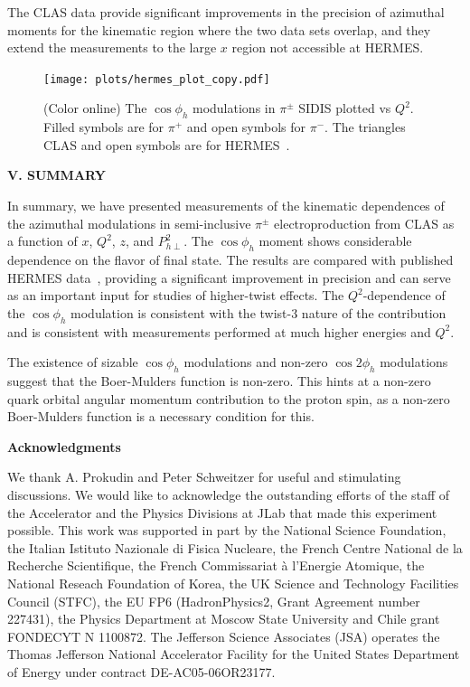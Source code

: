 \documentclass[aps,prl,twocolumn,showpacs,superscriptaddress,groupedaddress]{revtex4-1}  %
\newcommand{\Phperp}{P_{h\perp}}
\newcommand{\xbj}{x}
\begin{document}
The CLAS data provide significant improvements in the precision of azimuthal moments for the kinematic region where the two data sets overlap, and they extend the measurements to the large $\xbj$ region not accessible at HERMES.
\begin{figure}[h]
\begin{center}
\texttt{[image: plots/hermes\_plot\_copy.pdf]}
\end{center}
\caption{(Color online) The $\cos\phi_h$ modulations in $\pi^\pm$ SIDIS plotted vs $Q^2$. Filled symbols are for $\pi^+$ and open symbols for $\pi^-$.
The triangles CLAS and open symbols are for HERMES~\cite{Airapetian:2012yg}.}
\label{fig:clas-hermes}
\end{figure}


\begin{center}
\textbf{V. SUMMARY} \par
\end{center}
In summary, we have presented measurements of the kinematic dependences of the azimuthal modulations in semi-inclusive $\pi ^\pm$ electroproduction from CLAS as a function of $\xbj$, $Q^2$, $z$, and $\Phperp^2$.
The $\cos \phi_h$ moment shows considerable dependence on the flavor of final state. The results are compared with published HERMES data~\cite{Airapetian:2012yg}, 
providing  a significant improvement in precision and can serve as an important input for studies of higher-twist effects.
The  $Q^2$-dependence of the $\cos\phi_h$ modulation is consistent with 
the twist-3 nature of the contribution and is consistent with measurements performed at much higher energies and $Q^2$.

The existence of sizable $\cos\phi_h$ modulations and non-zero $\cos 2 \phi_h$ modulations suggest that the Boer-Mulders function is non-zero.
This hints at a non-zero quark orbital angular momentum contribution to the proton spin, as a non-zero Boer-Mulders function is a necessary condition for this.

\begin{center}
\textbf{Acknowledgments} \par
\end{center}
We thank A. Prokudin and Peter Schweitzer for useful and stimulating discussions.
We would like to acknowledge the outstanding efforts of the staff of the 
Accelerator and the Physics Divisions at JLab that made this experiment possible.
This work was supported in part by 
the National Science Foundation, 
the Italian Istituto Nazionale di Fisica Nucleare, 
the French Centre National de la Recherche Scientifique,
the French Commissariat \`{a} l'Energie Atomique, 
the National Reseach Foundation of Korea,
the UK Science and Technology Facilities Council (STFC),
the EU FP6 (HadronPhysics2, Grant Agreement number 227431),
the Physics Department at Moscow State University
and Chile grant FONDECYT N 1100872.
The Jefferson Science Associates (JSA) operates the Thomas Jefferson National Accelerator Facility for the United States Department of Energy under contract DE-AC05-06OR23177.



\end{document}
